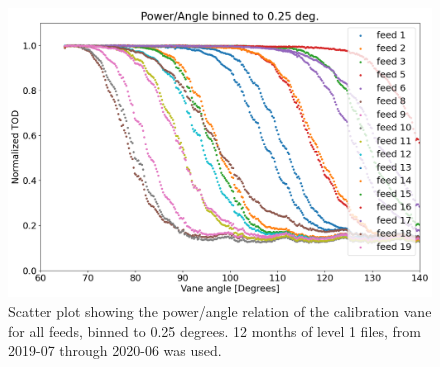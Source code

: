 \documentclass[10pt, a4paper]{article}
\begin{document}
\vspace{1cm}
\begin{figure}[H]
    \centering
    \includegraphics[scale=0.4]{../plots/binned_all.png}
    \caption{Scatter plot showing the power/angle relation of the calibration vane for all feeds, binned to 0.25 degrees. 12 months of level 1 files, from 2019-07 through 2020-06 was used.}
    \label{fig:binned_all}
\end{figure}
\end{document}
